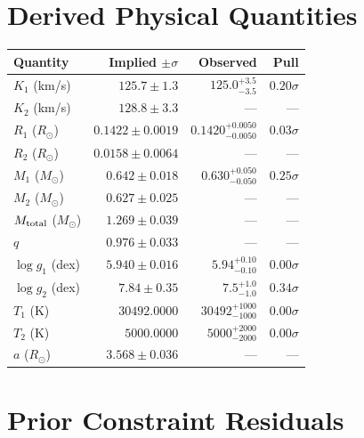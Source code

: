 \documentclass[11pt,a4paper]{article}
\newcommand{\thead}[1]{\textbf{\color{headerfg}#1}}
\begin{document}
\section{Derived Physical Quantities}

\begin{tabular}{l r r r}
\rowcolor{headerblue}
\thead{Quantity} & \thead{Implied $\pm\sigma$} & \thead{Observed} & \thead{Pull} \\
\toprule
$K_1$ (km/s) & $125.7 \pm 1.3$ & $125.0^{+3.5}_{-3.5}$ & \textbf{\textcolor{green!70!black}{$0.20\sigma$}} \\
$K_2$ (km/s) & $128.8 \pm 3.3$ & {\color{gray}---} & {\color{gray}---} \\
$R_1$ ($R_\odot$) & $0.1422 \pm 0.0019$ & $0.1420^{+0.0050}_{-0.0050}$ & \textbf{\textcolor{green!70!black}{$0.03\sigma$}} \\
$R_2$ ($R_\odot$) & $0.0158 \pm 0.0064$ & {\color{gray}---} & {\color{gray}---} \\
$M_1$ ($M_\odot$) & $0.642 \pm 0.018$ & $0.630^{+0.050}_{-0.050}$ & \textbf{\textcolor{green!70!black}{$0.25\sigma$}} \\
$M_2$ ($M_\odot$) & $0.627 \pm 0.025$ & {\color{gray}---} & {\color{gray}---} \\
$M_{\rm total}$ ($M_\odot$) & $1.269 \pm 0.039$ & {\color{gray}---} & {\color{gray}---} \\
$q$ & $0.976 \pm 0.033$ & {\color{gray}---} & {\color{gray}---} \\
$\log g_1$ (dex) & $5.940 \pm 0.016$ & $5.94^{+0.10}_{-0.10}$ & \textbf{\textcolor{green!70!black}{$0.00\sigma$}} \\
$\log g_2$ (dex) & $7.84 \pm 0.35$ & $7.5^{+1.0}_{-1.0}$ & \textbf{\textcolor{green!70!black}{$0.34\sigma$}} \\
$T_1$ (K) & $30492.0000$ & $30492^{+1000}_{-1000}$ & \textbf{\textcolor{green!70!black}{$0.00\sigma$}} \\
$T_2$ (K) & $5000.0000$ & $5000^{+2000}_{-2000}$ & \textbf{\textcolor{green!70!black}{$0.00\sigma$}} \\
$a$ ($R_\odot$) & $3.568 \pm 0.036$ & {\color{gray}---} & {\color{gray}---} \\
\bottomrule
\end{tabular}

\section{Prior Constraint Residuals}
\end{document}
